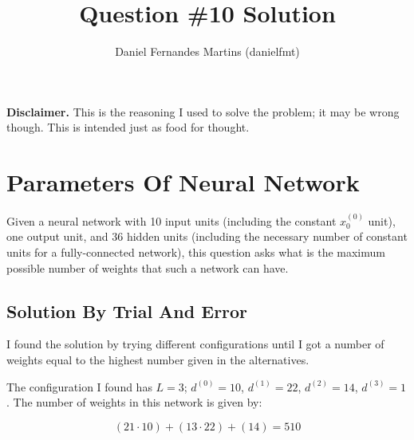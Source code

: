 \documentclass{article}
\author{Daniel Fernandes Martins (danielfmt)}
\title{Question \#10 Solution}
\begin{document}
\maketitle

\textbf{Disclaimer.} This is the reasoning I used to solve the problem; it
may be wrong though. This is intended just as food for thought.

\section{Parameters Of Neural Network}

Given a neural network with 10 input units (including the constant $x_0^{(0)}$
unit), one output unit, and 36 hidden units (including the necessary number of
constant units for a fully-connected network), this question asks what is the
maximum possible number of weights that such a network can have.

\subsection{Solution By Trial And Error}

I found the solution by trying different configurations until I got a number of
weights equal to the highest number given in the alternatives.

The configuration I found has $L=3$; $d^{(0)}=10$, $d^{(1)}=22$, $d^{(2)}=14$,
$d^{(3)}=1$. The number of weights in this network is given by:

\begin{equation*}
(21 \cdot 10) + (13 \cdot 22) + (14) = 510
\end{equation*}
\end{document}
